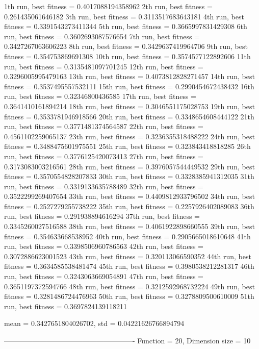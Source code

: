 1th run, best fitness = 0.4017088194358962
2th run, best fitness = 0.261435061646182
3th run, best fitness = 0.3113517683643181
4th run, best fitness = 0.3391543273411344
5th run, best fitness = 0.3665997831429308
6th run, best fitness = 0.3602693087576654
7th run, best fitness = 0.3427267063606223
8th run, best fitness = 0.3429637419964706
9th run, best fitness = 0.354753869691308
10th run, best fitness = 0.3574577122892606
11th run, best fitness = 0.3135481097701245
12th run, best fitness = 0.3296005995479163
13th run, best fitness = 0.4073812828271457
14th run, best fitness = 0.3537495557532111
15th run, best fitness = 0.2990454672438432
16th run, best fitness = 0.32346800436585
17th run, best fitness = 0.3641410161894214
18th run, best fitness = 0.3046551175028753
19th run, best fitness = 0.3533781946918566
20th run, best fitness = 0.3348654608444122
21th run, best fitness = 0.3771481374564587
22th run, best fitness = 0.4561102259065137
23th run, best fitness = 0.3236355318488222
24th run, best fitness = 0.3488475601975551
25th run, best fitness = 0.323843418818285
26th run, best fitness = 0.3776125420073413
27th run, best fitness = 0.3173083003216561
28th run, best fitness = 0.3976057544449532
29th run, best fitness = 0.3570554828207833
30th run, best fitness = 0.3328385941312035
31th run, best fitness = 0.3319133635788489
32th run, best fitness = 0.3522299269407654
33th run, best fitness = 0.4409812933796502
34th run, best fitness = 0.2527279255738222
35th run, best fitness = 0.2257926402089083
36th run, best fitness = 0.291938894616294
37th run, best fitness = 0.3345260027516588
38th run, best fitness = 0.4061922898660555
39th run, best fitness = 0.354633668538952
40th run, best fitness = 0.2905665018610648
41th run, best fitness = 0.3398506960786563
42th run, best fitness = 0.3072886623001523
43th run, best fitness = 0.320113066590352
44th run, best fitness = 0.3634585538481474
45th run, best fitness = 0.3980538212281317
46th run, best fitness = 0.3243063669054891
47th run, best fitness = 0.3651197372594766
48th run, best fitness = 0.3212592968732224
49th run, best fitness = 0.3281486724476963
50th run, best fitness = 0.3278809500610009
51th run, best fitness = 0.3697824139118211

mean = 0.3427651804026702, std = 0.04221626766894794

-------------------------------------------------------
Function = 20, Dimension size = 10

